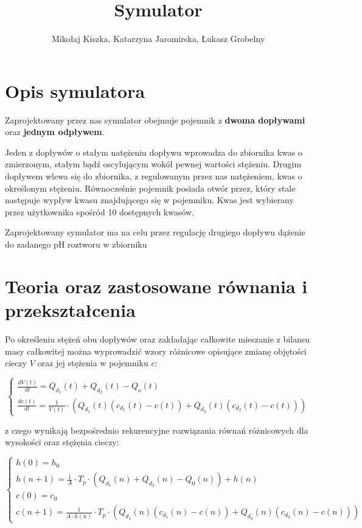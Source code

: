 \documentclass[polish,polish,a4paper,12pt]{article}
\title{Symulator}
\date{}
\author{Mikołaj Kiszka, Katarzyna Jaromirska, Łukasz Grobelny}
\begin{document}
	
	\maketitle
	\vspace{-4\baselineskip}
	
	\section{Opis symulatora}
	
	Zaprojektowany przez nas symulator obejmuje pojemnik z \textbf{dwoma dopływami} oraz \textbf{jednym odpływem}. 
	
	Jeden z dopływów o stałym natężeniu dopływu wprowadza do zbiornika kwas o zmierzonym, stałym bądź oscylującym wokół pewnej wartości stężeniu. Drugim dopływem wlewa się do zbiornika, z regulowanym przez nas natężeniem, kwas o określonym stężeniu. Równocześnie pojemnik posiada otwór przez, który stale następuje wypływ kwasu znajdującego się w pojemniku. Kwas jest wybierany przez użytkownika spośród 10 dostępnych kwasów.
	
	Zaprojektowany symulator ma na celu przez regulację drugiego dopływu dążenie do zadanego pH roztworu w zbiorniku
	
	\section{Teoria oraz zastosowane równania i przekształcenia}
	
	Po określeniu stężeń obu dopływów oraz zakładając całkowite mieszanie z bilansu masy całkowitej można wyprowadzić wzory różnicowe opisujące zmianę objętości cieczy $V$ oraz jej stężenia w pojemniku $c$:
	
	\begin{equation}
	\begin{cases}
		\frac{dV(t)}{dt} = Q_{d_{1}}(t) + Q_{d_{2}}(t) - Q_{o}(t) \\
		\frac{dc(t)}{dt} = \frac{1}{V(t)} \cdot \left(Q_{d_{1}}(t) \left(c_{d_{1}}(t) - c(t)\right) + Q_{d_{2}}(t)\left(c_{d_{2}}(t) - c(t)\right)\right)		
	\end{cases}
	\end{equation}

	z czego wynikają bezpośrednio rekurencyjne rozwiązania równań różnicowych dla wysokości oraz stężęnia cieczy:
	
	\begin{equation}
	\begin{cases}
		h(0) = h_{0}\\
		h(n+1) =\frac{1}{A} \cdot T_{p} \cdot \left(Q_{d_{1}}(n) + Q_{d_{2}}(n) - Q_{0}(n)\right) + h(n)\\
		c(0) = c_{0}\\
		c(n+1) = \frac{1}{A \cdot  h(n)} \cdot T_{p} \cdot \left(Q_{d_{1}}(n)\left(c_{d_{1}}(n) - c(n)\right) + Q_{d_{2}}(n)\left(c_{d_{2}}(n) - c(n)\right)\right)
	\end{cases}
	\end{equation}
\end{document}
